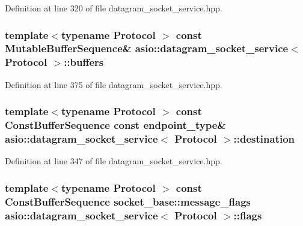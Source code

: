 Definition at line 320 of file datagram\+\_\+socket\+\_\+service.\+hpp.

\hypertarget{classasio_1_1datagram__socket__service_a2f09f91392522c3350176e4c46aec02a}{}
\subsubsection[{buffers}]{\setlength{\rightskip}{0pt plus 5cm}template$<$typename Protocol $>$ const Mutable\+Buffer\+Sequence\& {\bf asio\+::datagram\+\_\+socket\+\_\+service}$<$ Protocol $>$\+::buffers}\label{classasio_1_1datagram__socket__service_a2f09f91392522c3350176e4c46aec02a}


Definition at line 375 of file datagram\+\_\+socket\+\_\+service.\+hpp.

\hypertarget{classasio_1_1datagram__socket__service_ae9f85315015dd493ef24676bbb633eda}{}
\subsubsection[{destination}]{\setlength{\rightskip}{0pt plus 5cm}template$<$typename Protocol $>$ const Const\+Buffer\+Sequence const {\bf endpoint\+\_\+type}\& {\bf asio\+::datagram\+\_\+socket\+\_\+service}$<$ Protocol $>$\+::destination}\label{classasio_1_1datagram__socket__service_ae9f85315015dd493ef24676bbb633eda}


Definition at line 347 of file datagram\+\_\+socket\+\_\+service.\+hpp.

\hypertarget{classasio_1_1datagram__socket__service_a4bb3745dcca72273467ef14d34819736}{}
\subsubsection[{flags}]{\setlength{\rightskip}{0pt plus 5cm}template$<$typename Protocol $>$ const Const\+Buffer\+Sequence {\bf socket\+\_\+base\+::message\+\_\+flags} {\bf asio\+::datagram\+\_\+socket\+\_\+service}$<$ Protocol $>$\+::flags}\label{classasio_1_1datagram__socket__service_a4bb3745dcca72273467ef14d34819736}


